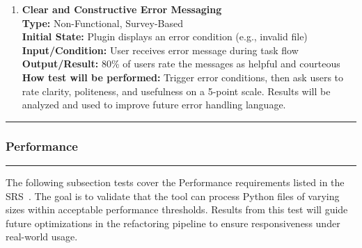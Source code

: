 \documentclass[12pt, titlepage]{article}
\newcommand{\colorrule}{\textcolor{BlueViolet}{\rule{\linewidth}{2pt}}}
\begin{document}
\begin{enumerate}[label={\bf \textcolor{Maroon}{test-UH-\arabic*}},
    wide=0pt, font=\itshape]
  \item \textbf{Clear and Constructive Error Messaging} \\[2mm]
    \textbf{Type:} Non-Functional, Survey-Based \\
    \textbf{Initial State:} Plugin displays an error condition (e.g., invalid file) \\
    \textbf{Input/Condition:} User receives error message during task flow \\
    \textbf{Output/Result:} 80\% of users rate the messages as helpful and courteous \\[2mm]
    \textbf{How test will be performed:} Trigger error conditions, then ask users to rate clarity, politeness, and usefulness on a 5-point scale. Results will be analyzed and used to improve future error handling language.
    
\end{enumerate}

  \noindent
  \textcolor{Blue}{\colorrule}

\subsubsection{Performance}
\colorrule

\medskip

\noindent
The following subsection tests cover the Performance requirements
listed in the SRS~\cite{SRS}. The goal is to validate that the tool
can process Python files of varying sizes within acceptable
performance thresholds. Results from this test will guide future
optimizations in the refactoring pipeline to ensure responsiveness
under real-world usage.
\end{document}
